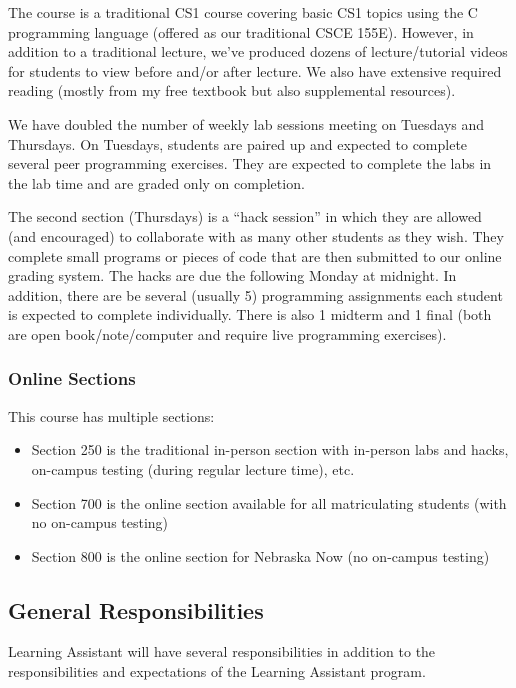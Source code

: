 \documentclass[12pt]{scrartcl}
\begin{document}
The course is a traditional CS1 course covering basic CS1 topics 
using the C programming language (offered as our traditional CSCE 155E).  
However, in addition to a traditional lecture, we've produced dozens of 
lecture/tutorial videos for students to view before and/or after lecture.  
We also have extensive required reading (mostly from my free textbook but 
also supplemental resources).  

We have doubled the number of weekly lab sessions meeting on Tuesdays and
Thursdays.  On Tuesdays, students are paired up and expected to complete 
several peer programming exercises.  They are 
expected to complete the labs in the lab time and are graded only on 
completion.

The second section (Thursdays) is a ``hack session'' in which they are 
allowed (and encouraged) to collaborate with as many other students as 
they wish.  They complete small programs or pieces of code that are 
then submitted to our online grading system.  The hacks are due the 
following Monday at midnight.  In addition, there are
be several (usually 5) programming assignments each student is expected
to complete individually.  There is also 1 midterm and 1 final (both 
are open book/note/computer and require live programming exercises). 

\subsubsection*{Online Sections}

This course has multiple sections:
\begin{itemize}
  \item Section 250 is the traditional in-person section with in-person
  labs and hacks, on-campus testing (during regular lecture time), etc.
  \item Section 700 is the online section available for all matriculating
  students (with no on-campus testing)
  \item Section 800 is the online section for Nebraska Now (no on-campus
  testing)
\end{itemize}

\subsection*{General Responsibilities}

Learning Assistant will have several responsibilities in addition to the
responsibilities and expectations of the Learning Assistant program.
\end{document}
